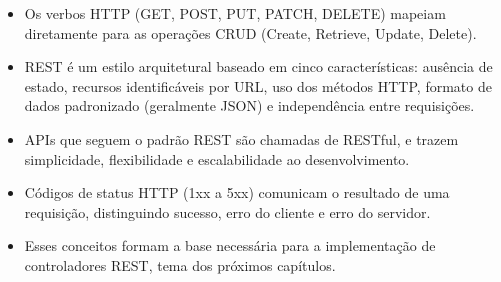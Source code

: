 \begin{itemize}
  \item Os verbos HTTP (GET, POST, PUT, PATCH, DELETE) mapeiam diretamente para as operações CRUD (Create, Retrieve, Update, Delete).
\end{itemize}

\begin{itemize}
  \item REST é um estilo arquitetural baseado em cinco características: ausência de estado, recursos identificáveis por URL, uso dos métodos HTTP, formato de dados padronizado (geralmente JSON) e independência entre requisições.
\end{itemize}

\begin{itemize}
  \item APIs que seguem o padrão REST são chamadas de RESTful, e trazem simplicidade, flexibilidade e escalabilidade ao desenvolvimento.
\end{itemize}

\begin{itemize}
  \item Códigos de status HTTP (1xx a 5xx) comunicam o resultado de uma requisição, distinguindo sucesso, erro do cliente e erro do servidor.
\end{itemize}

\begin{itemize}
  \item Esses conceitos formam a base necessária para a implementação de controladores REST, tema dos próximos capítulos.
\end{itemize}
